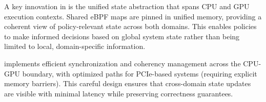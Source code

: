A key innovation in \sys is the unified state abstraction that spans CPU and GPU execution contexts. Shared eBPF maps are pinned in unified memory, providing a coherent view of policy-relevant state across both domains. This enables policies to make informed decisions based on global system state rather than being limited to local, domain-specific information.

\sys implements efficient synchronization and coherency management across the CPU-GPU boundary, with optimized paths for PCIe-based systems (requiring explicit memory barriers). This careful design ensures that cross-domain state updates are visible with minimal latency while preserving correctness guarantees.

